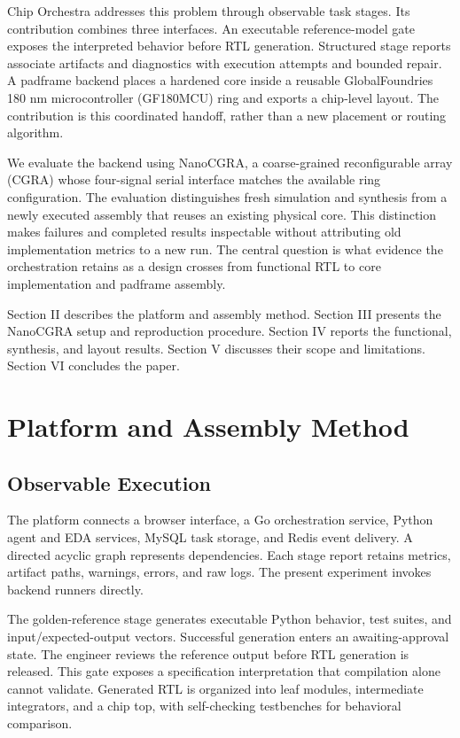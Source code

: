 \documentclass[conference,letterpaper]{IEEEtran}
\begin{document}
Chip Orchestra addresses this problem through observable task stages. Its contribution combines three interfaces. An executable reference-model gate exposes the interpreted behavior before RTL generation. Structured stage reports associate artifacts and diagnostics with execution attempts and bounded repair. A padframe backend places a hardened core inside a reusable GlobalFoundries 180 nm microcontroller (GF180MCU) ring and exports a chip-level layout. The contribution is this coordinated handoff, rather than a new placement or routing algorithm.

We evaluate the backend using NanoCGRA, a coarse-grained reconfigurable array (CGRA) whose four-signal serial interface matches the available ring configuration. The evaluation distinguishes fresh simulation and synthesis from a newly executed assembly that reuses an existing physical core. This distinction makes failures and completed results inspectable without attributing old implementation metrics to a new run. The central question is what evidence the orchestration retains as a design crosses from functional RTL to core implementation and padframe assembly.

Section II describes the platform and assembly method. Section III presents the NanoCGRA setup and reproduction procedure. Section IV reports the functional, synthesis, and layout results. Section V discusses their scope and limitations. Section VI concludes the paper.

\section{Platform and Assembly Method}
\subsection{Observable Execution}
The platform connects a browser interface, a Go orchestration service, Python agent and EDA services, MySQL task storage, and Redis event delivery. A directed acyclic graph represents dependencies. Each stage report retains metrics, artifact paths, warnings, errors, and raw logs. The present experiment invokes backend runners directly.

The golden-reference stage generates executable Python behavior, test suites, and input/expected-output vectors. Successful generation enters an awaiting-approval state. The engineer reviews the reference output before RTL generation is released. This gate exposes a specification interpretation that compilation alone cannot validate. Generated RTL is organized into leaf modules, intermediate integrators, and a chip top, with self-checking testbenches for behavioral comparison.
\end{document}
